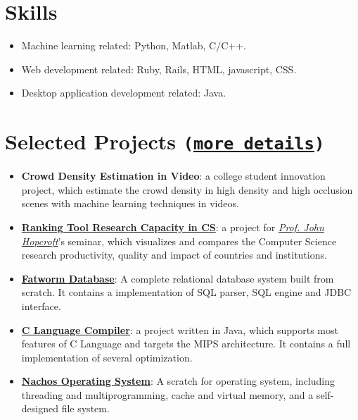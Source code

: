 \documentclass[letterpaper]{article}
\begin{document}
\section*{Skills}
\begin{itemize}
\item Machine learning related: Python, Matlab, C/C++.
\item Web development related: Ruby, Rails, HTML, javascript, CSS.
\item Desktop application development related: Java.
\end{itemize}
\section*{Selected Projects \normalsize{\tt(\href{https://github.com/lostleaf?tab=repositories}{more details})}}
\begin{itemize}
\item \textbf{Crowd Density Estimation in Video}:
a college student innovation project, which estimate the crowd density in high density and high occlusion scenes with machine learning techniques in videos.
\item \textbf{\href{http://acm.sjtu.edu.cn/ricsrt/}{Ranking Tool Research Capacity in CS}}:
a project for \emph{\href{http://www.cs.cornell.edu/jeh/}{Prof. John Hopcroft}}'s seminar, which visualizes and compares the Computer Science research productivity, quality and impact of countries and institutions.
\item \textbf{\href{https://github.com/lostleaf/fatworm}{Fatworm Database}}:
A complete relational database system built from scratch. It contains a implementation of SQL parser, SQL engine and JDBC interface.
\item \textbf{\href{https://github.com/lostleaf/compiler}{C Language Compiler}}:
a project written in Java, which supports most features of C Language and targets the MIPS architecture. It contains a full implementation of several optimization.
\item \textbf{\href{https://github.com/lostleaf/nachos}{Nachos Operating System}}: 
A scratch for operating system, including threading and multiprogramming, cache and virtual memory, and a self-designed file system.
\end{itemize}
\end{document}

